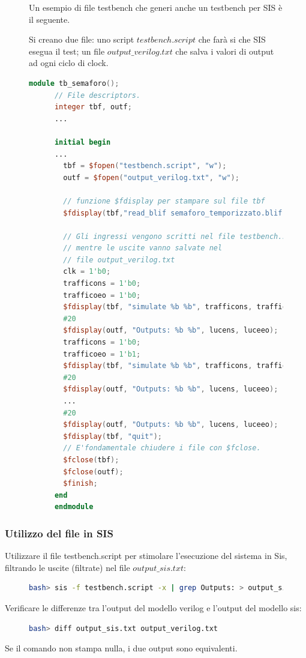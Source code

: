 \documentclass[a4paper]{article}
\theoremstyle{break}
\theoremstyle{break}
\theoremstyle{break}
\theoremstyle{break}
\begin{document}
\begin{figure}[H]
  \begin{example}
    Un esempio di file testbench che generi anche un testbench per SIS è il seguente.

    Si creano due file: uno script \( testbench.script \) che farà si che SIS esegua
    il test; un file \( output\_verilog.txt \) che salva i valori di output ad ogni
    ciclo di clock.
    \begin{lstlisting}[language=Verilog]
      module tb_semaforo();
      // File descriptors.
      integer tbf, outf;
      ...

      initial begin
      ...
        tbf = $fopen("testbench.script", "w");
        outf = $fopen("output_verilog.txt", "w");

        // funzione $fdisplay per stampare sul file tbf
        $fdisplay(tbf,"read_blif semaforo_temporizzato.blif");

        // Gli ingressi vengono scritti nel file testbench.script,
        // mentre le uscite vanno salvate nel 
        // file output_verilog.txt
        clk = 1'b0;
        trafficons = 1'b0;
        trafficoeo = 1'b0;
        $fdisplay(tbf, "simulate %b %b", trafficons, trafficoeo);
        #20
        $fdisplay(outf, "Outputs: %b %b", lucens, luceeo);
        trafficons = 1'b0;
        trafficoeo = 1'b1;
        $fdisplay(tbf, "simulate %b %b", trafficons, trafficoeo);
        #20
        $fdisplay(outf, "Outputs: %b %b", lucens, luceeo);
        ...
        #20
        $fdisplay(outf, "Outputs: %b %b", lucens, luceeo);
        $fdisplay(tbf, "quit");
        // E'fondamentale chiudere i file con $fclose.
        $fclose(tbf);
        $fclose(outf);
        $finish;
      end
      endmodule
    \end{lstlisting}
  \end{example}
\end{figure}
\subsubsection{Utilizzo del file in SIS}
Utilizzare il file testbench.script per stimolare l’esecuzione del sistema
in Sis, filtrando le uscite (filtrate) nel file \( output\_sis.txt \):
\begin{figure}[H]
  \begin{lstlisting}[language=bash]
    bash> sis -f testbench.script -x | grep Outputs: > output_sis.txt
  \end{lstlisting}
\end{figure}
Verificare le differenze tra l’output del modello verilog e l’output del
modello sis:
\begin{figure}[H]
  \begin{lstlisting}[language=bash]
    bash> diff output_sis.txt output_verilog.txt
  \end{lstlisting}
\end{figure}
Se il comando non stampa nulla, i due output sono equivalenti.
\end{document}

